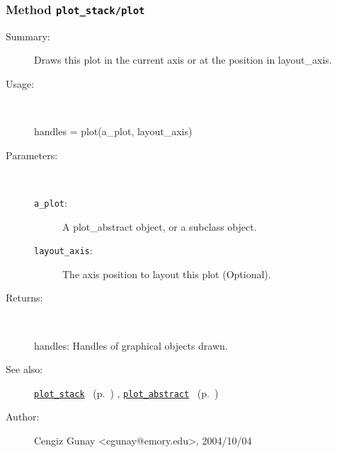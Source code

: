 \subsubsection[Method \texttt{plot}]{Method \texttt{plot\_stack/plot}}%
%
\label{ref_plot_stack__plot}%
\hypertarget{ref_plot_stack__plot}{}%
\begin{description}
\item[Summary:]Draws this plot in the current axis or at the position in
	layout\_axis.
%
\item[Usage:]~%
\begin{lyxcode}%
handles = plot(a\_plot, layout\_axis)
%
\end{lyxcode}%
%
%
\item[Parameters:]~
\begin{description}%
\item[\texttt{a\_plot}:]
 A plot\_abstract object, or a subclass object.
\item[\texttt{layout\_axis}:]
 The axis position to layout this plot (Optional). 
\end{description}%
%
\item[Returns:]~

	handles: Handles of graphical objects drawn.
%
%
\item[See also:]%
\hyperlink{ref_plot_stack}{\texttt{plot\_stack}}%
\ (p.~\pageref{ref_plot_stack})%
%
, \hyperlink{ref_plot_abstract}{\texttt{plot\_abstract}}%
\ (p.~\pageref{ref_plot_abstract})%
%
%
\item[Author:]%
Cengiz Gunay <cgunay@emory.edu>, 2004/10/04%
\end{description}
\methodline%
